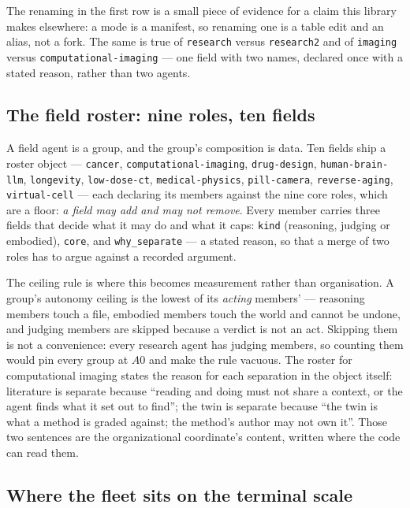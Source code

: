 The renaming in the first row is a small piece of evidence for a claim this library makes elsewhere: a mode is a manifest, so renaming one is a table edit and an alias, not a fork. The same is true of \texttt{research} versus \texttt{research2} and of \texttt{imaging} versus \texttt{computational-\allowbreak imaging} --- one field with two names, declared once with a stated reason, rather than two agents.

\subsection{The field roster: nine roles, ten fields}\label{sec:fieldroster}

A field agent is a group, and the group's composition is data. Ten fields ship a roster object --- \texttt{cancer}, \texttt{computational-\allowbreak imaging}, \texttt{drug-design}, \texttt{human-brain-llm}, \texttt{longevity}, \texttt{low-dose-ct}, \texttt{medical-physics}, \texttt{pill-camera}, \texttt{reverse-aging}, \texttt{virtual-cell} --- each declaring its members against the nine core roles, which are a floor: \emph{a field may add and may not remove}. Every member carries three fields that decide what it may do and what it caps: \texttt{kind} (reasoning, judging or embodied), \texttt{core}, and \texttt{why\_separate} --- a stated reason, so that a merge of two roles has to argue against a recorded argument.

The ceiling rule is where this becomes measurement rather than organisation. A group's autonomy ceiling is the lowest of its \emph{acting} members' --- reasoning members touch a file, embodied members touch the world and cannot be undone, and judging members are skipped because a verdict is not an act. Skipping them is not a convenience: every research agent has judging members, so counting them would pin every group at $A0$ and make the rule vacuous. The roster for computational imaging states the reason for each separation in the object itself: literature is separate because ``reading and doing must not share a context, or the agent finds what it set out to find''; the twin is separate because ``the twin is what a method is graded against; the method's author may not own it''. Those two sentences are the organizational coordinate's content, written where the code can read them.

\subsection{Where the fleet sits on the terminal scale}

